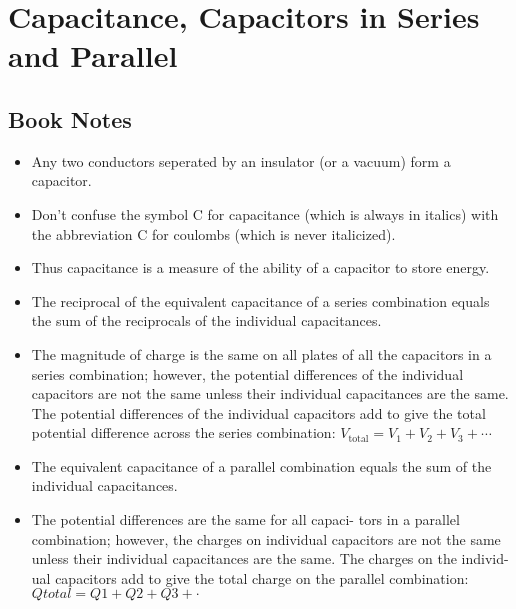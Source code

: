 \documentclass[11pt]{article}
\newcommand{\chapterTitle}{Capacitance, Capacitors in Series and Parallel}
\begin{document}
\section{\chapterTitle}

\subsection{Book Notes}
\begin{itemize}
    \item Any two conductors seperated by an insulator (or a vacuum) form a capacitor.
    \item Don’t confuse the symbol C for capacitance (which is always in italics) with the abbreviation C for coulombs (which is never italicized).
    \item Thus capacitance is a measure of the ability of a capacitor to store energy.
    \item The reciprocal of the equivalent capacitance of a series combination equals the sum of the reciprocals of the individual capacitances.
    \item The magnitude of charge is the same on all plates of all the capacitors in a series combination; however, the potential differences of the individual capacitors are not the same unless their individual capacitances are the same. The potential differences of the individual capacitors add to give the total potential difference across the series combination: $V_{\text{total}} = V_1 + V_2 + V_3 + \cdots$
    \item The equivalent capacitance of a parallel combination equals the sum of the individual capacitances.
    \item The potential differences are the same for all capaci- tors in a parallel combination; however, the charges on individual capacitors are not the same unless their individual capacitances are the same. The charges on the individ- ual capacitors add to give the total charge on the parallel combination: $Qtotal = Q1 + Q2 + Q3 + \cdot$
\end{itemize}
\end{document}
